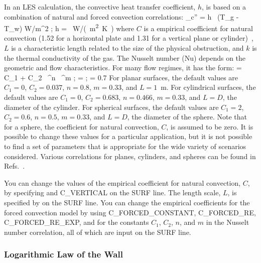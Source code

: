 \documentclass[11pt]{book}
\begin{document}
In an LES calculation, the convective heat transfer coefficient, $h$, is based on a combination of natural and forced convection correlations:
\be \dq_{\rm c}'' = h \, (T_{\rm g} - T_{\rm w}) \quad \hbox{W/m}^2 \quad ; \quad h =
    \max \,   \quad  \si{W/(m^2.K)}
\ee
where $C$ is a empirical coefficient for natural convection (1.52 for a horizontal plate and 1.31 for a vertical plane or cylinder)~\cite{Holman:1}, $L$ is a characteristic length related to the size of the physical obstruction, and $k$ is the thermal conductivity of the gas. The Nusselt number (Nu) depends on the geometric and flow characteristics. For many flow regimes, it has the form:
\be
   \NU = C_1 + C_2 \, \RE^n \, \PR^m  \quad ; \quad \RE =  \quad ; \quad \PR = 0.7
\ee
For planar surfaces, the default values are $C_1=0$, $C_2=0.037$, $n=0.8$, $m=0.33$, and $L=1$~m. For cylindrical surfaces, the default values are $C_1=0$, $C_2=0.683$, $n=0.466$, $m=0.33$, and $L=D$, the diameter of the cylinder. For spherical surfaces, the default values are $C_1=2$, $C_2=0.6$, $n=0.5$, $m=0.33$, and $L=D$, the diameter of the sphere. Note that for a sphere, the coefficient for natural convection, $C$, is assumed to be zero. It is possible to change these values for a particular application, but it is not possible to find a set of parameters that is appropriate for the wide variety of scenarios considered. Various correlations for planes, cylinders, and spheres can be found in Refs.~\cite{Holman:1,Incropera:1}.

You can change the values of the empirical coefficient for natural convection, $C$, by specifying  and {\ct C\_VERTICAL} on the {\ct SURF} line. The length scale, $L$, is specified by  on the {\ct SURF} line. You can change the empirical coefficients for the forced convection model by using {\ct C\_FORCED\_CONSTANT}, {\ct C\_FORCED\_RE}, {\ct C\_FORCED\_RE\_EXP}, and  for the constants $C_1$, $C_2$, $n$, and $m$ in the Nusselt number correlation, all of which are input on the {\ct SURF} line.

\subsubsection{Logarithmic Law of the Wall}
\end{document}
